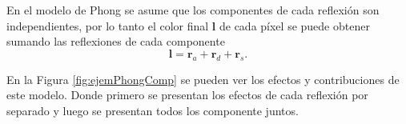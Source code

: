 En el modelo de Phong se asume que los componentes de cada reflexión son independientes, por lo tanto el color final $\textbf{l}$ de cada píxel se puede obtener sumando las reflexiones de cada componente 
\begin{equation}
\textbf{l} = \textbf{r}_a + \textbf{r}_d + \textbf{r}_s. 
\label{ec:phongModelunaLuz}
\end{equation}

En la Figura \ref{fig:ejemPhongComp} se pueden ver los efectos y contribuciones de este modelo. Donde primero se presentan los efectos de cada reflexión por separado y luego se presentan todos los componente juntos.

\begin{figure}[htp]
  \begin{center}

\end{center}
\end{figure}
